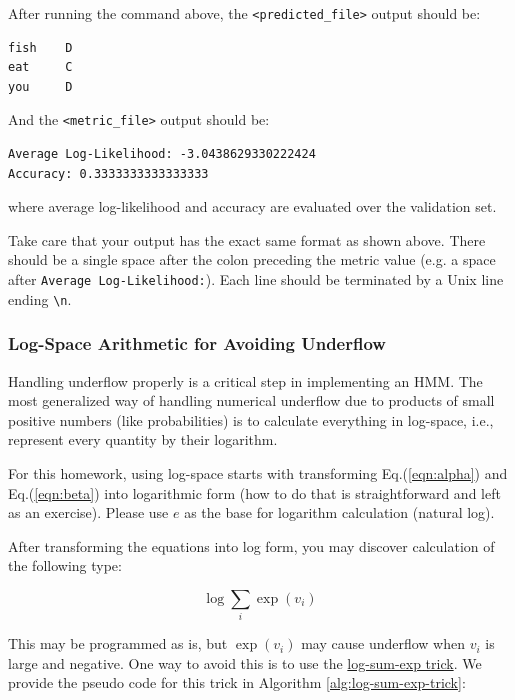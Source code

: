 \documentclass[11pt,addpoints,answers]{exam}
\begin{document}
After running the command above, the \texttt{<predicted\_file>} output should be:

\begin{lstlisting}
fish    D 
eat     C
you     D

\end{lstlisting}

And the \texttt{<metric\_file>} output should be:

\begin{lstlisting}
Average Log-Likelihood: -3.0438629330222424
Accuracy: 0.3333333333333333
\end{lstlisting}

where average log-likelihood and accuracy are evaluated over the validation set.

Take care that your output has the exact same format as shown above. There should be a single space after the colon preceding the metric value (e.g. a space after \lstinline{Average Log-Likelihood:}). Each line should be terminated by a Unix line ending \lstinline{\n}.

\clearpage
\subsubsection{Log-Space Arithmetic for Avoiding Underflow}
\label{sec:underflow}

Handling underflow properly is a critical step in implementing an HMM. The most generalized way of handling numerical underflow due to products of small positive numbers (like probabilities) is to calculate everything in log-space, i.e., represent every quantity by their logarithm. 

For this homework, using log-space starts with transforming Eq.(\ref{eqn:alpha}) and Eq.(\ref{eqn:beta}) into logarithmic form (how to do that is straightforward and left as an exercise). Please use $e$ as the base for logarithm calculation (natural log).

After transforming the equations into log form, you may discover calculation of the following type:

$$ \log \sum_i \exp{(v_i)}$$

This may be programmed as is, but $\exp{(v_i)}$ may cause underflow when $v_i$ is large and negative. One way to avoid this is to use the \href{https://www.xarg.org/2016/06/the-log-sum-exp-trick-in-machine-learning/}{log-sum-exp trick}. We provide the pseudo code for this trick in Algorithm \ref{alg:log-sum-exp-trick}:
\end{document}
